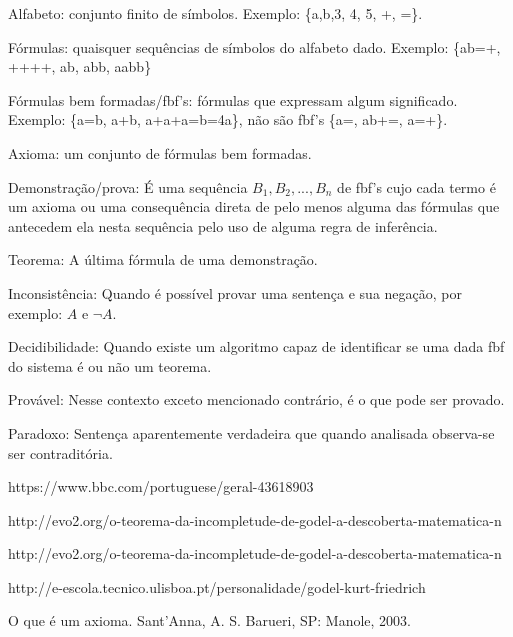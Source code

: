 \documentclass{article}
\begin{document}
\begin{multicols}{3}
Alfabeto: conjunto finito de símbolos. Exemplo: \{a,b,3, 4, 5, +, =\}.

Fórmulas: quaisquer sequências de símbolos do alfabeto dado. Exemplo: \{ab=+, ++++, ab, abb, aabb\}

Fórmulas bem formadas/fbf's: fórmulas que expressam algum significado. Exemplo: \{a=b, a+b, a+a+a=b=4a\}, não são fbf's \{a=, ab+=, a=+\}.

Axioma: um conjunto de fórmulas bem formadas.

Demonstração/prova: É uma sequência $B_1, B_2, ..., B_n$ de fbf's cujo cada termo é um axioma ou uma consequência direta de pelo menos alguma das fórmulas que antecedem ela nesta sequência pelo uso de alguma regra de inferência.

Teorema: A última fórmula de uma demonstração.

Inconsistência: Quando é possível provar uma sentença e sua negação, por exemplo: $A$ e $\lnot A$.

Decidibilidade: Quando existe um algoritmo capaz de identificar se uma dada fbf do sistema é ou não um teorema.

Provável: Nesse contexto exceto mencionado contrário, é o que pode ser provado.

Paradoxo: Sentença aparentemente verdadeira que quando analisada observa-se ser contraditória.


https://www.bbc.com/portuguese/geral-43618903

http://evo2.org/o-teorema-da-incompletude-de-godel-a-descoberta-matematica-n%

http://evo2.org/o-teorema-da-incompletude-de-godel-a-descoberta-matematica-n%

http://e-escola.tecnico.ulisboa.pt/personalidade/godel-kurt-friedrich

O que é um axioma. Sant'Anna, A. S. Barueri, SP: Manole, 2003.
\closearticle

\end{multicols}
\end{document}
